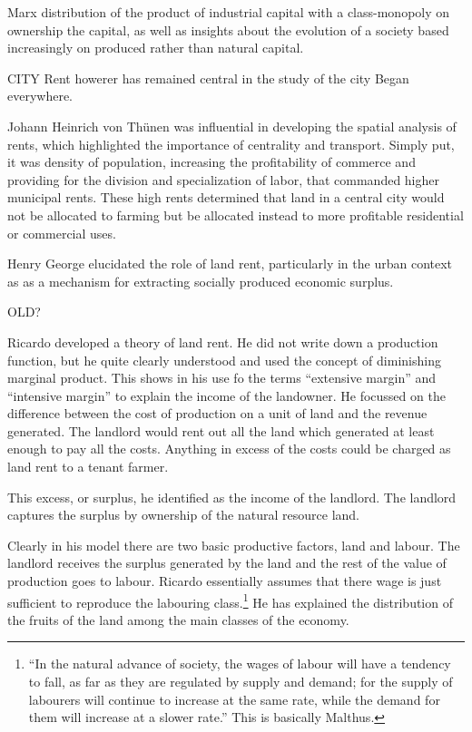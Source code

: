 Marx
distribution of the product of industrial capital with a class-monopoly on ownership the capital,  as well as insights about the evolution of a society based increasingly on produced rather than natural capital. 



CITY
Rent howerer has remained central in the study of the city
Began everywhere.

Johann Heinrich von Th\"unen was influential in developing the spatial analysis of rents, which highlighted the importance of centrality and transport. Simply put, it was density of population, increasing the profitability of commerce and providing for the division and specialization of labor, that commanded higher municipal rents. These high rents determined that land in a central city would not be allocated to farming but be allocated instead to more profitable residential or commercial uses. 


 Henry George elucidated the role of land rent, particularly in the urban context as as a mechanism for extracting socially produced economic surplus.  

OLD?
 
Ricardo developed a theory of land rent. He did not write down a production function, but he quite clearly understood and used the concept of diminishing marginal product. This shows in his use fo the terms ``extensive margin'' and ``intensive margin'' to explain the income of the landowner. He focussed on the difference between the cost of production on a unit of land and the revenue generated. The landlord would rent out all the land which generated at least enough to pay all the costs. Anything in excess of the costs could be charged as land rent to a tenant farmer.

This excess, or surplus, he identified as the income of the landlord. The landlord captures the surplus by ownership of the natural resource land. 

Clearly in his model there are two basic productive factors, land and labour. The landlord  receives the surplus generated by the land and the rest of the value of production goes to labour. Ricardo essentially assumes that there wage is  just sufficient to reproduce the labouring class.\footnote{ ``In the natural advance of society, the wages of labour will have a tendency to fall, as far as they are regulated by supply and demand; for the supply of labourers will continue to increase at the same rate, while the demand for them will increase at a slower rate.''  This is  basically Malthus.} He has explained the distribution of the fruits of the land among the main classes of the economy.

